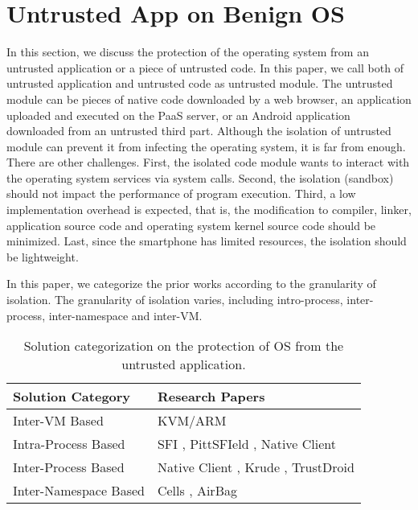 \section{Untrusted App on Benign OS}
\label{sec:problem2}

In this section, we discuss the protection of the operating system from an
untrusted application or a piece of untrusted code. In this paper, we call both
of untrusted application and untrusted code as untrusted module. The untrusted
module can be pieces of native code downloaded by a web browser, an application
uploaded and executed on the PaaS server, or an Android application downloaded
from an untrusted third part. Although the isolation of untrusted module can
prevent it from infecting the operating system, it is far from enough. There are
other challenges. First, the isolated code module wants to interact with the
operating system services via system calls. Second, the isolation (sandbox)
should not impact the performance of program execution. Third, a low
implementation overhead is expected, that is, the modification to compiler,
linker, application source code and operating system kernel source code should
be minimized. Last, since the smartphone has limited resources, the isolation
should be lightweight. 

In this paper, we categorize the prior works according to the granularity of
isolation. The granularity of isolation varies, including intro-process,
inter-process, inter-namespace and inter-VM. 

\begin{table*}[ht]
	\centering
	\begin{tabular}{|l|l|}
		\hline
		\textbf{Solution Category}      & \textbf{Research Papers} \\ \hline
		Inter-VM Based         & KVM/ARM \cite{KVM/ARM} \\ \hline
		Intra-Process Based    & SFI \cite{SFI}, PittSFIeld \cite{PittSFIeld}, Native Client \cite{NaCl} \\ \hline
		Inter-Process Based    & Native Client \cite{NaCl}, Krude \etal \cite{Krude}, TrustDroid \cite{TrustDroid}\\ \hline
		Inter-Namespace Based  & Cells \cite{Cells}, AirBag \cite{AirBag} \\ \hline	
	\end{tabular}
	\caption{Solution categorization on the protection of OS from the untrusted
	application.}
	\label{my-label}
\end{table*}

